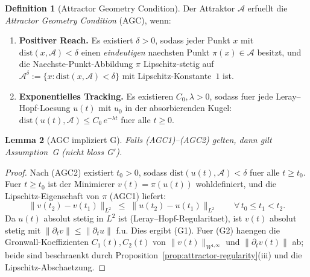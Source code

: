 \documentclass[12pt,a4paper]{article}
\theoremstyle{definition}
\newtheorem{definition}{Definition}[section]
\theoremstyle{plain}
\newtheorem{lemma}[definition]{Lemma}
\theoremstyle{remark}
\begin{document}
\begin{definition}[Attractor Geometry Condition]\label{def:AGC}
Der Attraktor $\mathcal{A}$ erfuellt die \emph{Attractor Geometry
Condition} (AGC), wenn:
\begin{enumerate}
  \item[\textup{(AGC1)}] \textbf{Positiver Reach.}\;
    Es existiert $\delta > 0$, sodass jeder Punkt $x$ mit
    $\mathrm{dist}(x, \mathcal{A}) < \delta$ einen \emph{eindeutigen}
    naechsten Punkt $\pi(x) \in \mathcal{A}$ besitzt, und die Naechste-Punkt-Abbildung
    $\pi$ Lipschitz-stetig auf
    $\mathcal{A}^\delta := \{x : \mathrm{dist}(x,\mathcal{A}) < \delta\}$
    mit Lipschitz-Konstante~$1$ ist.
  \item[\textup{(AGC2)}] \textbf{Exponentielles Tracking.}\;
    Es existieren $C_0, \lambda > 0$, sodass fuer jede Leray--Hopf-Loesung
    $u(t)$ mit $u_0$ in der absorbierenden Kugel:
    $\mathrm{dist}(u(t), \mathcal{A}) \le C_0\,e^{-\lambda t}$ fuer alle
    $t \ge 0$.
\end{enumerate}
\end{definition}

\begin{lemma}[AGC impliziert G]\label{lem:AGC-implies-G}
Falls \textup{(AGC1)--(AGC2)} gelten, dann gilt Assumption~G
\textup{(}nicht bloss G$'$\textup{)}.
\end{lemma}

\begin{proof}
Nach (AGC2) existiert $t_0 > 0$, sodass
$\mathrm{dist}(u(t), \mathcal{A}) < \delta$ fuer alle $t \ge t_0$.
Fuer $t \ge t_0$ ist der Minimierer $v(t) = \pi(u(t))$ wohldefiniert, und
die Lipschitz-Eigenschaft von $\pi$ (AGC1) liefert:
\[
  \|v(t_2) - v(t_1)\|_{L^2}
  \;\le\;
  \|u(t_2) - u(t_1)\|_{L^2}
  \qquad \forall\, t_0 \le t_1 < t_2.
\]
Da $u(t)$ absolut stetig in $L^2$ ist (Leray--Hopf-Regularitaet),
ist $v(t)$ absolut stetig mit $\|\partial_t v\| \le \|\partial_t u\|$
f.u. Dies ergibt (G1). Fuer (G2) haengen die Gronwall-Koeffizienten $C_1(t),
C_2(t)$ von $\|v(t)\|_{W^{1,\infty}}$ und $\|\partial_t v(t)\|$ ab;
beide sind beschraenkt durch
Proposition~\ref{prop:attractor-regularity}(iii) und die Lipschitz-Abschaetzung.
\end{proof}
\end{document}
